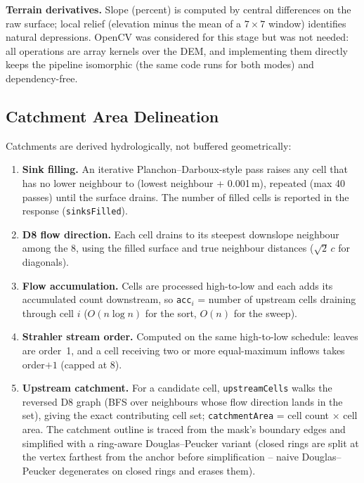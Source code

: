 \documentclass[manuscript,screen,review]{acmart}
\begin{document}
\textbf{Terrain derivatives.} Slope (percent) is computed by central
differences on the raw surface; local relief (elevation minus the mean of a
$7\times7$ window) identifies natural depressions. OpenCV was considered for
this stage but was not needed: all operations are array kernels over the DEM,
and implementing them directly keeps the pipeline isomorphic (the same code
runs for both modes) and dependency-free.

\subsection{Catchment Area Delineation}
Catchments are derived hydrologically, not buffered geometrically:

\begin{enumerate}
  \item \textbf{Sink filling.} An iterative Planchon--Darboux-style pass
  raises any cell that has no lower neighbour to (lowest neighbour +
  0.001\,m), repeated (max 40 passes) until the surface drains. The number
  of filled cells is reported in the response (\texttt{sinksFilled}).
  \item \textbf{D8 flow direction.} Each cell drains to its steepest
  downslope neighbour among the 8, using the filled surface and true
  neighbour distances ($\sqrt{2}\,c$ for diagonals).
  \item \textbf{Flow accumulation.} Cells are processed high-to-low and each
  adds its accumulated count downstream, so
  \texttt{acc}$_i$ = number of upstream cells draining through cell $i$
  ($O(n \log n)$ for the sort, $O(n)$ for the sweep).
  \item \textbf{Strahler stream order.} Computed on the same high-to-low
  schedule: leaves are order~1, and a cell receiving two or more equal-maximum
  inflows takes order${+}1$ (capped at 8).
  \item \textbf{Upstream catchment.} For a candidate cell,
  \texttt{upstreamCells} walks the reversed D8 graph (BFS over neighbours
  whose flow direction lands in the set), giving the exact contributing cell
  set; \texttt{catchmentArea} = cell count $\times$ cell area. The catchment
  outline is traced from the mask's boundary edges and simplified with a
  ring-aware Douglas--Peucker variant (closed rings are split at the vertex
  farthest from the anchor before simplification -- naive Douglas--Peucker
  degenerates on closed rings and erases them).
\end{enumerate}
\end{document}
